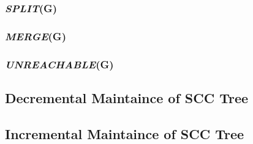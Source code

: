 \subsubsection{\textit{SPLIT}(G)}
\subsubsection{\textit{MERGE}(G)}
\subsubsection{\textit{UNREACHABLE}(G)}




\subsection{Decremental Maintaince of SCC Tree}\label{Subsec: Decremental Maintaince of SCC Tree}




\subsection{Incremental Maintaince of SCC Tree}\label{Subsec: Incremental Maintaince of SCC Tree}
\blindtext